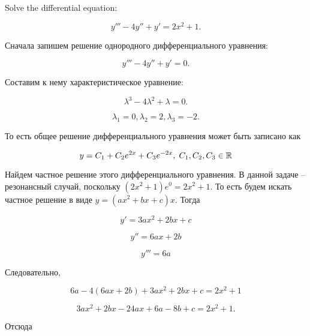 \documentclass[addpoints, answers]{exam} %
\begin{document}
\begin{questions}

\question Solve the  differential equation:

\[
y''' -4y'' +y' =2x^{2} +1.
\]

\begin{solution}
Сначала запишем решение однородного дифференциального уравнения:

\[y''' -4y'' +y' =0.\]

Составим к нему характеристическое уравнение:

  \[\lambda ^{3} -4\lambda ^{2} +\lambda =0.\]

  \[\lambda _{1} =0,\lambda _{2} =2,\lambda _{3} =-2.\]

  То есть общее решение дифференциального уравнения может быть записано как

  \[y=C_{1} +C_{2} e^{2x} +C_{3} e^{-2x},\; C_{1} ,C_{2} ,C_{3} \in \mathbb R \]

  Найдем частное решение этого дифференциального уравнения. В данной задаче -- резонансный случай, поскольку $\left(2x^{2} +1\right)e^{0} =2x^{2} +1$. То есть будем искать частное решение в виде $y=(ax^{2} +bx+c)x$. Тогда

  \[y' =3ax^{2} +2bx+c\]

  \[y'' =6ax+2b\]

  \[y''' =6a\]

  Следовательно,

  \[6a-4(6ax+2b)+3ax^{2} +2bx+c=2x^{2} +1\]

  \[3ax^{2} +2bx-24ax+6a-8b+c=2x^{2} +1.\]

  Отсюда


\end{solution}
\end{questions}
\end{document}
